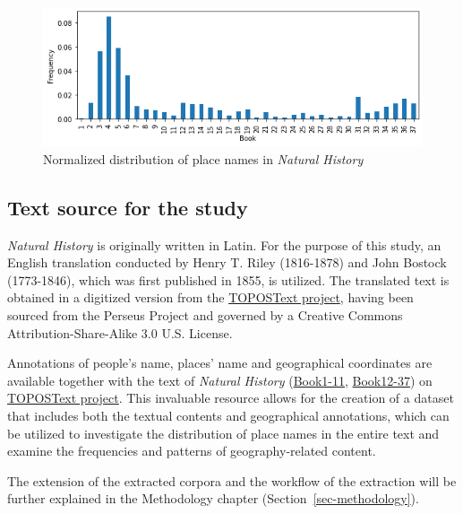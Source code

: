 \documentclass[
  12pt,
]{article}
\begin{document}
\begin{figure}[H]

{\centering \includegraphics{NHthesis_0728_files/figure-pdf/fig-place_distribution-output-1.png}

}

\caption{\label{fig-place_distribution}Normalized distribution of place
names in \emph{Natural History}}

\end{figure}

\hypertarget{text-source-for-the-study}{%
\subsection{Text source for the study}\label{text-source-for-the-study}}

\emph{Natural History} is originally written in Latin. For the purpose
of this study, an English translation conducted by Henry T. Riley
(1816-1878) and John Bostock (1773-1846), which was first published in
1855, is utilized. The translated text is obtained in a digitized
version from the \href{https://topostext.org/the-project}{TOPOSText
project}, having been sourced from the Perseus Project and governed by a
Creative Commons Attribution-Share-Alike 3.0 U.S. License.

Annotations of people's name, places' name and geographical coordinates
are available together with the text of \emph{Natural History}
(\href{https://topostext.org/work/148}{Book1-11},
\href{https://topostext.org/work/153}{Book12-37}) on
\href{https://topostext.org/the-project}{TOPOSText project}. This
invaluable resource allows for the creation of a dataset that includes
both the textual contents and geographical annotations, which can be
utilized to investigate the distribution of place names in the entire
text and examine the frequencies and patterns of geography-related
content.

The extension of the extracted corpora and the workflow of the
extraction will be further explained in the Methodology chapter
(Section~\ref{sec-methodology}).
\end{document}
